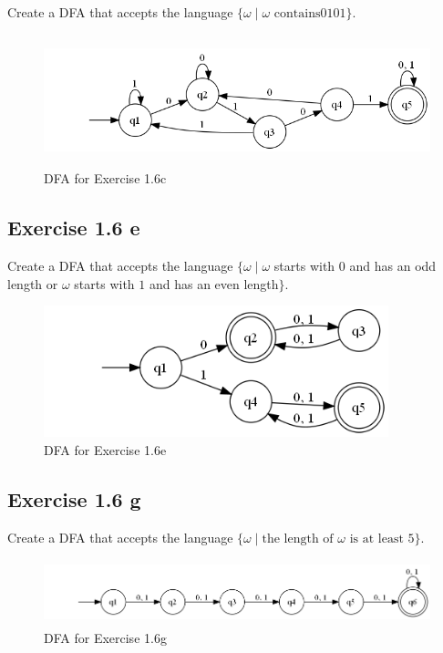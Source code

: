 \documentclass{article}
\newcommand{\where}{\mid}
\begin{document}
Create a DFA that accepts the language $\{ \omega \where \omega \text{ contains
} 0101 \}$.

\begin{figure}[h!]
	\includegraphics[height=1.5in]{1_6_c.png}
	\caption{DFA for Exercise 1.6c}
\end{figure}

\subsection{Exercise 1.6 e}

Create a DFA that accepts the language $\{ \omega \where \omega $ starts
with $0$ and has an odd length or $\omega$ starts with $1$ and has an even
length$\}$.

\begin{figure}[h!]
	\includegraphics[height=1.5in]{1_6_e.png}
	\caption{DFA for Exercise 1.6e}
\end{figure}

\subsection{Exercise 1.6 g}

Create a DFA that accepts the language $\{ \omega \where \text{the length of }
\omega \text{ is at least } 5 \}$.

\begin{figure}[h!]
	\includegraphics[height=0.75in]{1_6_g.png}
	\caption{DFA for Exercise 1.6g}
\end{figure}
\end{document}
